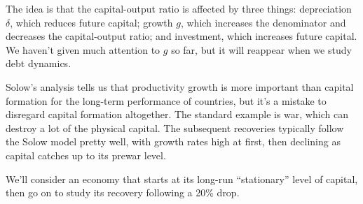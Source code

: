 \documentclass[12pt]{exam}
\begin{document}
\begin{questions}
\begin{solution}
\begin{parts}
The idea is that the capital-output ratio is affected by three things:
depreciation $\delta$, which reduces future capital; growth $g$,
which increases the denominator and decreases the capital-output ratio;
and investment, which increases future capital.
We haven't given much attention to $g$ so far,
but it will reappear when we study debt dynamics.

\end{parts}
\end{solution}

Solow's analysis tells us that productivity growth
is more important than capital formation for the long-term
performance of countries,
but it's a mistake to disregard capital formation altogether.
The standard example is war,
which can destroy a lot of the physical capital.
The subsequent recoveries typically follow the Solow model pretty well,
with growth rates high at first, then declining as capital catches up
to its prewar level.

We'll consider an economy that starts at its long-run
``stationary'' level of capital, then go on
to study its recovery following a 20\% drop.
%


\end{questions}
\end{document}
